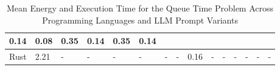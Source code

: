 \begin{table}[]
{\begin{tabular}{|l|lllllll|lllllll|}
  \multicolumn{1}{l|}{{\color[HTML]{666666} 0.14}} &
  \multicolumn{1}{l|}{{\color[HTML]{666666} 0.08}} &
  \multicolumn{1}{l|}{{\color[HTML]{666666} 0.35}} &
  \multicolumn{1}{l|}{{\color[HTML]{666666} 0.14}} &
  \multicolumn{1}{l|}{{\color[HTML]{666666} 0.35}} &
  {\color[HTML]{666666} 0.14} \\ \hline
{\color[HTML]{666666} Rust} &
  \multicolumn{1}{l|}{{\color[HTML]{666666} 2.21}} &
  \multicolumn{1}{l|}{{\color[HTML]{666666} -}} &
  \multicolumn{1}{l|}{{\color[HTML]{666666} -}} &
  \multicolumn{1}{l|}{{\color[HTML]{666666} -}} &
  \multicolumn{1}{l|}{{\color[HTML]{666666} -}} &
  \multicolumn{1}{l|}{{\color[HTML]{666666} -}} &
  {\color[HTML]{666666} -} &
  \multicolumn{1}{l|}{{\color[HTML]{666666} 0.16}} &
  \multicolumn{1}{l|}{{\color[HTML]{666666} -}} &
  \multicolumn{1}{l|}{{\color[HTML]{666666} -}} &
  \multicolumn{1}{l|}{{\color[HTML]{666666} -}} &
  \multicolumn{1}{l|}{{\color[HTML]{666666} -}} &
  \multicolumn{1}{l|}{{\color[HTML]{666666} -}} &
  {\color[HTML]{666666} -} \\ \hline
\end{tabular}%
}
\centering
\caption{Mean Energy and Execution Time for the Queue Time Problem Across Programming Languages and LLM Prompt Variants}
\end{table}
